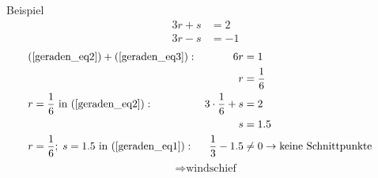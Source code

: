 \documentclass{article}
\begin{document}
\begin{boxx}[DarkBlue]{Beispiel}
\begin{align}
        3r + s &= 2 \label{geraden_eq2}\\
        3r - s &= -1 \label{geraden_eq3}
    \end{align}
    \begin{align*}
        &&&&&\text{(\ref{geraden_eq2})} + \text{(\ref{geraden_eq3})}:& 6r &= 1 &&&&&&\\
        &&&&&& r &= \frac{1}{6} \\
        &&&&& r = \frac{1}{6} \text{ in (\ref{geraden_eq2})}:& 3 \cdot \frac{1}{6} + s &= 2 \\
        &&&&&& s &= 1.5 \\
        &&&&& r = \frac{1}{6};\; s = 1.5\text{ in (\ref{geraden_eq1})}:& \frac{1}{3} - 1.5 &\not= 0 \rightarrow \text{keine Schnittpunkte}
    \end{align*}
    \[\Rightarrow \text{windschief}\]
\end{boxx}
\end{document}
